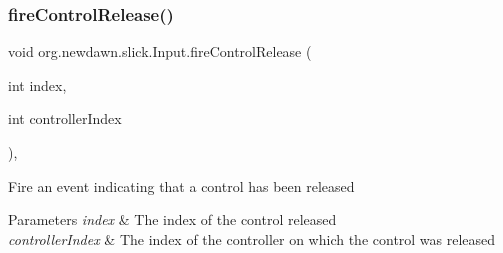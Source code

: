 \subsubsection{\texorpdfstring{fire\+Control\+Release()}{fireControlRelease()}}
{\footnotesize\ttfamily void org.\+newdawn.\+slick.\+Input.\+fire\+Control\+Release (\begin{DoxyParamCaption}\item[{int}]{index,  }\item[{int}]{controller\+Index }\end{DoxyParamCaption})\hspace{0.3cm}{\ttfamily [inline]}, {\ttfamily [private]}}

Fire an event indicating that a control has been released


\begin{DoxyParams}{Parameters}
{\em index} & The index of the control released \\
\hline
{\em controller\+Index} & The index of the controller on which the control was released \\
\hline
\end{DoxyParams}

